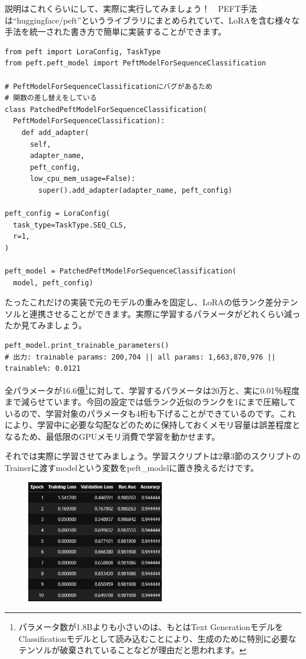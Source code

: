 \documentclass[a5paper,twoside,dvipdfmx]{jsarticle}
\begin{document}
説明はこれくらいにして、実際に実行してみましょう！　PEFT手法は``huggingface/peft''というライブラリにまとめられていて、LoRAを含む様々な手法を統一された書き方で簡単に実装することができます。

\begin{lstlisting}
from peft import LoraConfig, TaskType
from peft.peft_model import PeftModelForSequenceClassification

# PeftModelForSequenceClassificationにバグがあるため
# 関数の差し替えをしている
class PatchedPeftModelForSequenceClassification(
  PeftModelForSequenceClassification):
    def add_adapter(
      self,
      adapter_name,
      peft_config, 
      low_cpu_mem_usage=False):
        super().add_adapter(adapter_name, peft_config)

peft_config = LoraConfig(
  task_type=TaskType.SEQ_CLS,
  r=1,
)

peft_model = PatchedPeftModelForSequenceClassification(
  model, peft_config)
\end{lstlisting}

たったこれだけの実装で元のモデルの重みを固定し、LoRAの低ランク差分テンソルと連携させることができます。実際に学習するパラメータがどれくらい減ったか見てみましょう。

\begin{lstlisting}
peft_model.print_trainable_parameters()
# 出力: trainable params: 200,704 || all params: 1,663,870,976 || trainable%: 0.0121
\end{lstlisting}

全パラメータが16.6億\footnote{パラメータ数が1.8Bよりも小さいのは、もとはText GenerationモデルをClassificationモデルとして読み込むことにより、生成のために特別に必要なテンソルが破棄されていることなどが理由だと思われます。}に対して、学習するパラメータは20万と、実に0.01％程度まで減らせています。今回の設定では低ランク近似のランクを1にまで圧縮しているので、学習対象のパラメータも4桁も下げることができているのです。これにより、学習中に必要な勾配などのために保持しておくメモリ容量は誤差程度となるため、最低限のGPUメモリ消費で学習を動かせます。

それでは実際に学習させてみましょう。学習スクリプトは2章3節のスクリプトのTrainerに渡すmodelという変数をpeft\_modelに置き換えるだけです。

\begin{figure}[h]
  \centering
  \includegraphics[width=60mm]{../C105Fig/gray/lora_train.png}
 \end{figure} 
\end{document}
